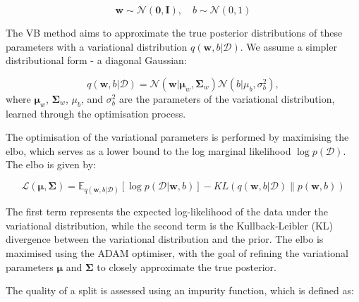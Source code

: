 \documentclass[3p,review,authoryear]{elsarticle}
\begin{document}
\begin{equation}
\mathbf{w} \sim \mathcal{N}(\mathbf{0}, \mathbf{I}), \quad b \sim \mathcal{N}(0, 1)
\end{equation}

The VB method aims to approximate the true posterior distributions of these parameters with a variational distribution \(q(\mathbf{w}, b|\mathcal{D})\).
We assume a simpler distributional form - a diagonal Gaussian:

\begin{equation}
q(\mathbf{w}, b|\mathcal{D}) = \mathcal{N}(\mathbf{w}|\boldsymbol{\mu}_w, \boldsymbol{\Sigma}_w) \mathcal{N}(b|\mu_b, \sigma_b^2),
\end{equation}
where \(\boldsymbol{\mu}_w\), \(\boldsymbol{\Sigma}_w\), \(\mu_b\), and \(\sigma_b^2\) are the parameters of the variational distribution, learned through the optimisation process.

The optimisation of the variational parameters is performed by maximising the \gls{elbo}, which serves as a lower bound to the log marginal likelihood \(\log p(\mathcal{D})\).
The \gls{elbo} is given by:

\begin{equation}
\mathcal{L}(\boldsymbol{\mu}, \boldsymbol{\Sigma}) = \mathbb{E}_{q(\mathbf{w}, b|\mathcal{D})}\left[\log p(\mathcal{D}|\mathbf{w}, b)\right] - KL\left(q(\mathbf{w}, b|\mathcal{D}) \parallel p(\mathbf{w}, b)\right)
\label{eq:elbo}
\end{equation}

The first term represents the expected log-likelihood of the data under the variational distribution, while the second term is the Kullback-Leibler (KL) divergence between the variational distribution and the prior. The \gls{elbo} is maximised using the ADAM optimiser, with the goal of refining the variational parameters \(\boldsymbol{\mu}\) and \(\boldsymbol{\Sigma}\) to closely approximate the true posterior.

The quality of a split is assessed using an impurity function, which is defined as:
\end{document}
